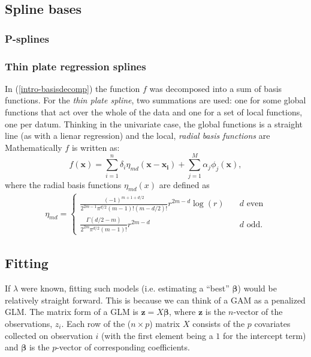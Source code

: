 \subsection{Spline bases}



\subsubsection{P-splines}

\subsubsection{Thin plate regression splines}
\label{GAMtprs}
\label{GAMtprspenalty}

In (\ref{intro-basisdecomp}) the function $f$ was decomposed into a sum of basis functions. For the \textit{thin plate spline}, two summations are used: one for some global functions that act over the whole of the data and one for a set of local functions, one per datum. Thinking in the univariate case, the global functions is a straight line (as with a lienar regression) and the local, \textit{radial basis functions} are  Mathematically $f$ is written as:
\begin{equation}
f(\mathbf{x}) = \sum_{i=1}^n \delta_i \eta_{md}(\mathbf{x}-\mathbf{x_i}) + \sum_{j=1}^M \alpha_j \phi_j(\mathbf{x}),
\label{tprs-basis} 
\end{equation}
where the radial basis functions $\eta_{md}(x)$ are defined as
\begin{align}
\eta_{md} =\begin{cases} \frac{(-1)^{m+1+d/2}}{2^{2m-1}\pi^{d/2}(m-1)!(m-d/2)!} r^{2m-d} \log(r) &\quad{\text{$d$ even}}\\
\frac{\Gamma(d/2-m)}{2^{2m}\pi^{d/2}(m-1)!} r^{2m-d} &\quad{\text{$d$ odd.}}
\end{cases}
\end{align}


\subsection{Fitting}

If $\lambda$ were known, fitting such models (i.e. estimating a ``best'' $\bm{\beta}$) would be relatively straight forward. This is because we can think of a GAM as a penalized GLM. The matrix form of a GLM is $\mathbf{z}=X\bm{\beta}$, where $\mathbf{z}$ is the $n$-vector of the observations, $z_i$. Each row of the ($n\times p$) matrix $X$ consists of the $p$ covariates collected on observation $i$ (with the first element being a $1$ for the intercept term) and $\bm{\beta}$ is the $p$-vector of corresponding coefficients.

